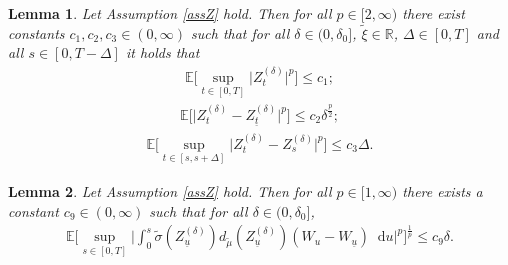 \documentclass[10pt,a4paper]{amsart}
\newtheorem{lemma}{Lemma}
\newcommand{\E}{{\mathbb{E}}}
\newcommand{\R}{{\mathbb{R}}}
\newcommand{\diff}{\mathop{}\!\mathrm{d}}
\begin{document}
\begin{lemma}\label{ME}
Let Assumption \ref{assZ} hold. Then for all $p\in[2,\infty)$ there exist constants $c_1, c_2, c_3 \in(0,\infty)$ such that for all $\delta\in(0,\delta_0]$, $\widetilde\xi\in\R$, $\Delta \in[0,T]$ and all $s\in[0,T-\Delta]$ it holds that 
\begin{equation}\label{LME1}
\begin{aligned}
\E\Big[\sup_{t\in[0,T]} \big|Z^{(\delta)}_t\big|^p\Big] \leq c_1;
\end{aligned}
\end{equation}
\begin{equation}\label{LME2}
\begin{aligned}
\E\Big[  \big|Z^{(\delta)}_t- Z^{(\delta)}_{\underline t}\big|^p\Big] \leq c_2 \delta^{\frac{p}{2}};
\end{aligned}
\end{equation}
\begin{equation}\label{LME4}
    \begin{aligned}
    \E\Big[\sup_{t\in[s,s+\Delta]} \big|Z^{(\delta)}_t- Z^{(\delta)}_{s}\big|^p\Big] \leq c_3 \Delta.
    \end{aligned}
\end{equation}
\end{lemma}

\begin{lemma}\label{AuxLemma}
    Let Assumption \ref{assZ} hold. Then for all $p\in[1,\infty)$ there exists a constant $c_{9}\in(0,\infty)$ such that for all $\delta\in (0,\delta_0]$,
    \begin{equation}
        \begin{aligned}
        \E\Big[\sup_{s\in[0,T]}\Big|\int_0^s  \widetilde\sigma(Z^{(\delta)}_{\underline u}) d_{\widetilde\mu}(Z^{(\delta)}_{\underline u}) (W_u-W_{\underline u})  \diff u\Big|^p \Big]^{\frac{1}{p}} \leq c_{9} \delta.
        \end{aligned}
    \end{equation}
\end{lemma}
\end{document}
